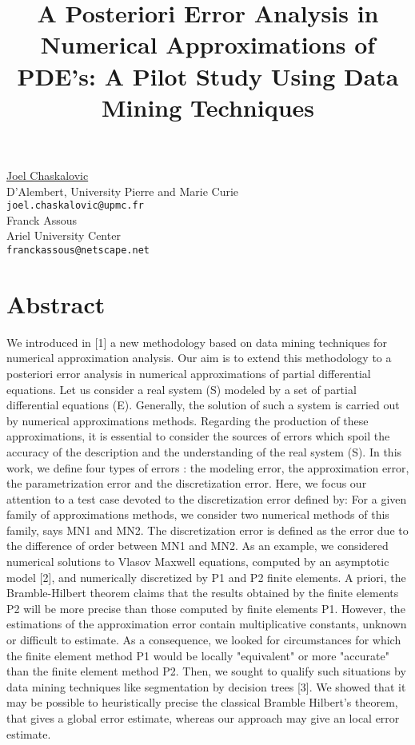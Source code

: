 \documentclass[article,A4,11pt]{llncs}%
\begin{document}
\title{A Posteriori Error Analysis in Numerical Approximations of PDE's: A Pilot Study Using Data Mining Techniques}
 \author{} \institute{}
\maketitle
\begin{center}
{\large \underline{Joel Chaskalovic}}\\
D'Alembert, University Pierre and Marie Curie\\
{\tt joel.chaskalovic@upmc.fr}
\\ \vspace{4mm}
{\large Franck Assous}\\
Ariel University Center\\
{\tt franckassous@netscape.net}
\end{center}

\section*{Abstract}
We introduced in [1] a new methodology based on data mining techniques for numerical approximation analysis. Our aim is to extend this methodology to a posteriori error analysis in numerical approximations of partial differential equations. Let us consider a real system (S) modeled by a set of partial differential equations (E). Generally, the solution of such a system is carried out by numerical approximations methods. Regarding the production of these approximations, it is essential to consider the sources of errors which spoil the accuracy of the description and the understanding of the real system (S). In this work, we define four types of errors : the modeling error, the approximation error, the parametrization error and the discretization error. Here, we focus our attention to a test case devoted to the discretization error defined by: For a given family of approximations methods, we consider two numerical methods of this family, says MN1 and MN2. The discretization error is defined as the error due to the difference of order between MN1 and MN2.
As an example, we considered numerical solutions to Vlasov Maxwell equations, computed by an asymptotic model [2], and numerically discretized by P1 and P2 finite elements. A priori, the Bramble-Hilbert theorem claims that the results obtained by the finite elements P2 will be more precise than those computed by finite elements P1. However, the estimations of the approximation error contain multiplicative constants, unknown or difficult to estimate. As a consequence, we looked for circumstances for which the finite element method P1 would be locally "equivalent" or more "accurate" than the finite element method P2. Then, we sought to qualify such situations by data mining techniques like segmentation by decision trees [3]. We showed that it may  be possible to heuristically precise the classical Bramble Hilbert's theorem, that gives a global error estimate, whereas our approach may give an local error estimate.
\end{document}
